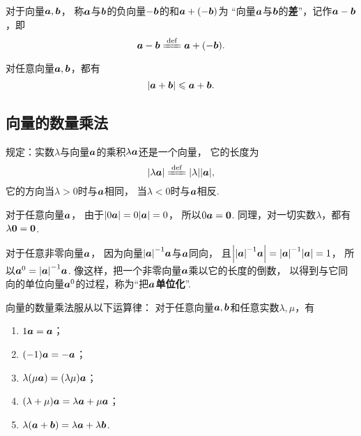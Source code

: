 \begin{definition}
对于向量\(\boldsymbol{a},\boldsymbol{b}\)，
称\(\boldsymbol{a}\)与\(\boldsymbol{b}\)的负向量\(-\boldsymbol{b}\)的和\(\boldsymbol{a}+(-\boldsymbol{b})\)为
“向量\(\boldsymbol{a}\)与\(\boldsymbol{b}\)的\textbf{差}”，记作\(\boldsymbol{a}-\boldsymbol{b}\)，即\[
	\mat{a}-\mat{b}
	\defeq
	\mat{a}+(-\mat{b}).
\]
\end{definition}

\begin{theorem}
对任意向量\(\boldsymbol{a},\boldsymbol{b}\)，都有\[
\abs{\boldsymbol{a}+\boldsymbol{b}} \leqslant \boldsymbol{a} + \boldsymbol{b}.
\]
\end{theorem}

\subsection{向量的数量乘法}
\begin{definition}
规定：实数\(\lambda\)与向量\(\boldsymbol{a}\)的乘积\(\lambda \boldsymbol{a}\)还是一个向量，
它的长度为\[
\abs{\lambda\mat{a}}
\defeq
\abs{\lambda} \abs{\mat{a}},
\]
它的方向当\(\lambda>0\)时与\(\boldsymbol{a}\)相同，
当\(\lambda<0\)时与\(\boldsymbol{a}\)相反.
\end{definition}

对于任意向量\(\boldsymbol{a}\)，
由于\(\abs{0 \boldsymbol{a}} = 0 \abs{\boldsymbol{a}} = 0\)，
所以\(0 \boldsymbol{a} = \boldsymbol{0}\).
同理，对一切实数\(\lambda\)，都有\(\lambda \boldsymbol{0} = \boldsymbol{0}\).

对于任意非零向量\(\boldsymbol{a}\)，
因为向量\(\abs{\boldsymbol{a}}^{-1} \boldsymbol{a}\)与\(\boldsymbol{a}\)同向，
且\(\abs{\abs{\boldsymbol{a}}^{-1} \boldsymbol{a}}
= \abs{\boldsymbol{a}}^{-1} \abs{\boldsymbol{a}} = 1\)，
所以\(\boldsymbol{a}^0 = \abs{\boldsymbol{a}}^{-1} \boldsymbol{a}\).
像这样，把一个非零向量\(\boldsymbol{a}\)乘以它的长度的倒数，
以得到与它同向的单位向量\(\boldsymbol{a}^0\)的过程，称为“把\(\boldsymbol{a}\)\textbf{单位化}”.

向量的数量乘法服从以下运算律：
对于任意向量\(\boldsymbol{a},\boldsymbol{b}\)和任意实数\(\lambda,\mu\)，有
\begin{enumerate}
	\item \(1 \boldsymbol{a} = \boldsymbol{a}\)；
	\item \((-1) \boldsymbol{a} = -\boldsymbol{a}\)；
	\item \(\lambda(\mu \boldsymbol{a}) = (\lambda \mu) \boldsymbol{a}\)；
	\item \((\lambda+\mu) \boldsymbol{a} = \lambda \boldsymbol{a} + \mu \boldsymbol{a}\)；
	\item \(\lambda (\boldsymbol{a}+\boldsymbol{b}) = \lambda \boldsymbol{a} + \lambda \boldsymbol{b}\).
\end{enumerate}

